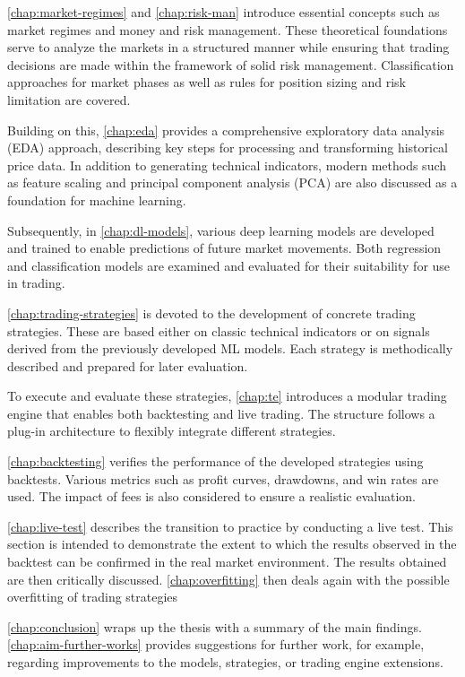 \autoref{chap:market-regimes} and \autoref{chap:risk-man} introduce essential concepts such as market regimes and money and risk management.
These theoretical foundations serve to analyze the markets in a structured manner while ensuring that trading decisions are made within the framework of solid risk management.
Classification approaches for market phases as well as rules for position sizing and risk limitation are covered.


Building on this, \autoref{chap:eda} provides a comprehensive exploratory data analysis (EDA) approach, describing key steps for processing and transforming historical price data.
In addition to generating technical indicators, modern methods such as feature scaling and principal component analysis (PCA) are also discussed as a foundation for machine learning.

Subsequently, in \autoref{chap:dl-models}, various deep learning models are developed and trained to enable predictions of future market movements.
Both regression and classification models are examined and evaluated for their suitability for use in trading.

\autoref{chap:trading-strategies} is devoted to the development of concrete trading strategies.
These are based either on classic technical indicators or on signals derived from the previously developed ML models.
Each strategy is methodically described and prepared for later evaluation.

To execute and evaluate these strategies, \autoref{chap:te} introduces a modular trading engine that enables both backtesting and live trading.
The structure follows a plug-in architecture to flexibly integrate different strategies.

\autoref{chap:backtesting} verifies the performance of the developed strategies using backtests.
Various metrics such as profit curves, drawdowns, and win rates are used.
The impact of fees is also considered to ensure a realistic evaluation.

\autoref{chap:live-test} describes the transition to practice by conducting a live test.
This section is intended to demonstrate the extent to which the results observed in the backtest can be confirmed in the real market environment.
The results obtained are then critically discussed.
\autoref{chap:overfitting} then deals again with the possible overfitting of trading strategies

\autoref{chap:conclusion} wraps up the thesis with a summary of the main findings.
\autoref{chap:aim-further-works} provides suggestions for further work, for example, regarding improvements to the models, strategies, or trading engine extensions.

